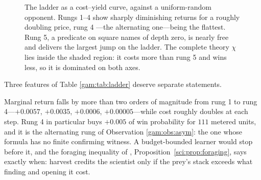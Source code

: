 \begin{figure}[h]
\centering
{}
\caption{The ladder as a cost--yield curve, against a uniform-random opponent.
Rungs 1--4 show sharply diminishing returns for a roughly doubling price, rung 4
---the alternating one---being the flattest. Rung 5, a predicate on square names
of depth zero, is nearly free and delivers the largest jump on the ladder. The complete theory $\chi$ lies inside the shaded
region: it costs more than rung 5 and wins less, so it is dominated on both
axes.}
\label{gam:fig:pareto}
\end{figure}

Three features of Table \ref{gam:tab:ladder} deserve separate statements.

\begin{observation}\label{gam:diminishing-returns-until-they}
Marginal return falls by more than two orders of magnitude from rung 1 to rung
4---$+0.0057$, $+0.0035$, $+0.0006$, $+0.00005$---while cost roughly doubles at
each step. Rung 4 in particular buys $+0.005$ of win probability for $111$
metered units, and it is the alternating rung of Observation \ref{gam:obs:asym}: the
one whose formula has no finite confirming witness. A budget-bounded learner
would stop before it, and the foraging
inequality of \chSci, Proposition~\ref{sci:prop:foraging}, says exactly when: harvest
credits the scientist only if the prey's stack exceeds what finding and opening
it cost.
\end{observation}

